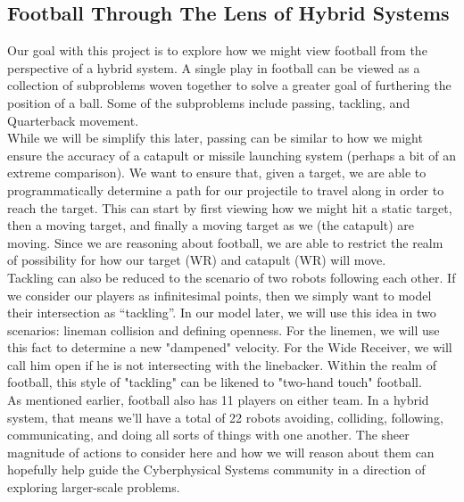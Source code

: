 \subsection{Football Through The Lens of Hybrid Systems}

\quad Our goal with this project is to explore how we might view football from the perspective of a hybrid system. A single play in football can be viewed as a collection of subproblems woven together to solve a greater goal of furthering the position of a ball. Some of the subproblems include passing, tackling, and Quarterback movement. \\

While we will be simplify this later, passing can be similar to how we might ensure the accuracy of a catapult or missile launching system (perhaps a bit of an extreme comparison). We want to ensure that, given a target, we are able to programmatically determine a path for our projectile to travel along in order to reach the target. This can start by first viewing how we might hit a static target, then a moving target, and finally a moving target as we (the catapult) are moving. Since we are reasoning about football, we are able to restrict the realm of possibility for how our target (WR) and catapult (WR) will move. \\

Tackling can also be reduced to the scenario of two robots following each other. If we consider our players as infinitesimal points, then we simply want to model their intersection as “tackling”. In our model later, we will use this idea in two scenarios: lineman collision and defining openness. For the linemen, we will use this fact to determine a new "dampened" velocity. For the Wide Receiver, we will call him open if he is not intersecting with the linebacker. Within the realm of football, this style of "tackling" can be likened to "two-hand touch" football. \\

As mentioned earlier, football also has 11 players on either team. In a hybrid system, that means we'll have a total of 22 robots avoiding, colliding, following, communicating, and doing all sorts of things with one another. The sheer magnitude of actions to consider here and how we will reason about them can hopefully help guide the Cyberphysical Systems community in a direction of exploring larger-scale problems.
